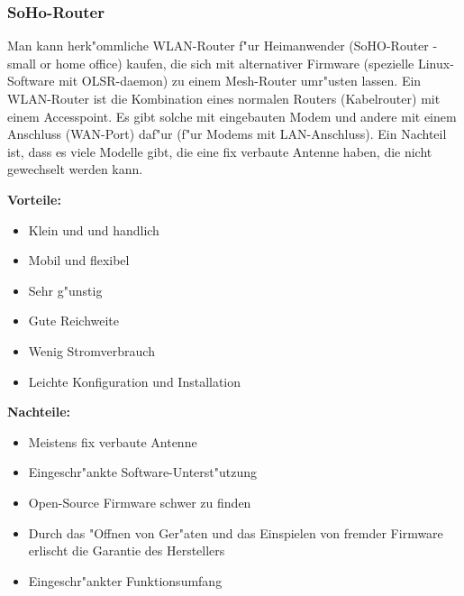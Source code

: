 \subsubsection{SoHo-Router}

Man kann herk"ommliche WLAN-Router f"ur Heimanwender (SoHO-Router - small
or home office) kaufen, die sich mit alternativer Firmware (spezielle
Linux-Software mit OLSR-daemon) zu einem Mesh-Router umr"usten
lassen. Ein WLAN-Router ist die Kombination eines normalen Routers
(Kabelrouter) mit einem Accesspoint. Es gibt solche mit eingebauten
Modem und andere mit einem Anschluss (WAN-Port) daf"ur (f"ur Modems mit
LAN-Anschluss). Ein Nachteil ist, dass es viele Modelle gibt, die eine
fix verbaute Antenne haben, die nicht gewechselt werden kann.

\textbf{Vorteile:}

\begin{itemize}
	\item Klein und	und handlich
	\item Mobil und flexibel
	\item Sehr g"unstig
	\item Gute Reichweite
	\item Wenig Stromverbrauch
	\item Leichte Konfiguration und Installation
\end{itemize}

\textbf{Nachteile:}

\begin{itemize}
	\item Meistens fix verbaute Antenne 
	\item Eingeschr"ankte Software-Unterst"utzung
	\item Open-Source Firmware schwer zu finden
	\item Durch das "Offnen von Ger"aten und das Einspielen von
	fremder Firmware erlischt die Garantie des Herstellers
	\item Eingeschr"ankter Funktionsumfang
\end{itemize}

